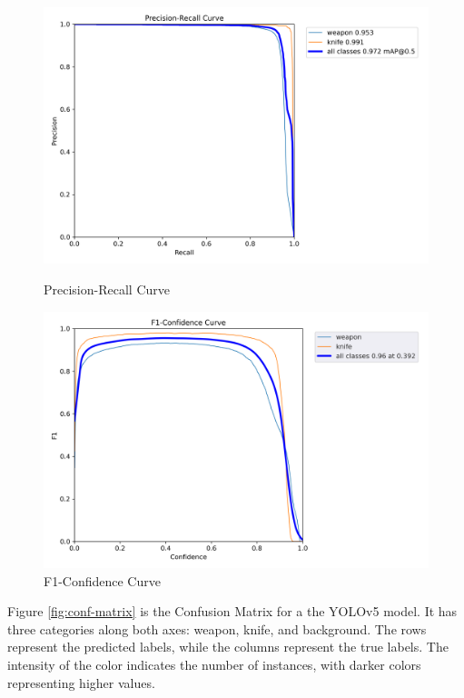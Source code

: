 \begin{figure}[h]
    \centering
    \begin{minipage}{0.49\textwidth}
        \centering
        \includegraphics[width=1\linewidth]{figs/PR_curve.png}
        \caption{Precision-Recall Curve}
        \label{fig:pr-curve}
    \end{minipage}\hfill
    \begin{minipage}{0.49\textwidth}
        \centering
        \includegraphics[width=1\linewidth]{figs/F1_curve.png}
        \caption{F1-Confidence Curve}
        \label{fig:f1-curve}
    \end{minipage}
\end{figure}

Figure \ref{fig:conf-matrix} is the Confusion Matrix for a the YOLOv5 model. It has three categories along both 
axes: weapon, knife, and background. The rows represent the 
predicted labels, while the columns represent the true labels. The intensity of the color indicates the number 
of instances, with darker colors representing higher values.


